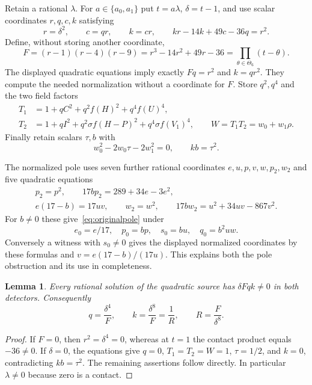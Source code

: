 \documentclass[11pt,a4paper]{article}
\newtheorem{lemma}[theorem]{Lemma}
\begin{document}
Retain a rational $\lambda$. For $a\in\{a_0,a_1\}$ put $t=a\lambda$,
$\delta=t-1$, and use scalar coordinates $r,q,c,k$ satisfying
\begin{equation}\label{eq:contactcircuit}
 r=\delta^2,\qquad c=qr,\qquad k=cr,\qquad
 kr-14k+49c-36q=r^2.
\end{equation}
Define, without storing another coordinate,
\[
 F=(r-1)(r-4)(r-9)=r^3-14r^2+49r-36
   =\prod_{\theta\in\Theta_6}(t-\theta).
\]
The displayed quadratic equations imply exactly $Fq=r^2$ and $k=qr^2$.
They compute the needed normalization without a coordinate for $F$.
Store $q^2,q^4$ and the two field factors
\begin{equation}\label{eq:packed}
 \begin{split}
 T_1&=1+qC^2+q^2f(H)^2+q^4f(U)^4,\\
 T_2&=1+qI^2+q^2\sigma f(H-P)^2+q^4\sigma f(V_1)^4,
 \qquad W=T_1T_2=w_0+w_1\rho.
 \end{split}
\end{equation}
Finally retain scalars $\tau,b$ with
\begin{equation}\label{eq:trace}
             w_0^2-2w_0\tau-2w_1^2=0,\qquad
             kb=\tau^2.
\end{equation}

The normalized pole uses seven further rational coordinates
$e,u,p,v,w,p_2,w_2$ and five quadratic equations
\begin{equation}\label{eq:normalizedpole}
 \begin{gathered}
 p_2=p^2,\qquad 17bp_2=289+34e-3e^2,\\
 e(17-b)=17uv,\qquad w_2=w^2,\qquad
 17bw_2=u^2+34uv-867v^2.
 \end{gathered}
\end{equation}
For $b\ne0$ these give~\eqref{eq:originalpole} under
\[
 e_0=e/17,\quad p_0=bp,\quad s_0=bu,\quad q_0=b^2uw.
\]
Conversely a witness with $s_0\ne0$ gives the displayed normalized
coordinates by these formulas and $v=e(17-b)/(17u)$.
This explains both the pole obstruction and its use in completeness.

\begin{lemma}\label{lem:domain}
Every rational solution of the quadratic source has $\delta Fqk\ne0$
in both detectors. Consequently
\[
 q=\frac{\delta^4}{F},\qquad
 k=\frac{\delta^8}F=\frac1R,
 \qquad R=\frac F{\delta^8}.
\]
\end{lemma}
\begin{proof}
If $F=0$, then $r^2=\delta^4=0$, whereas at $t=1$ the contact
product equals $-36\ne0$.
If $\delta=0$, the equations give $q=0$, $T_1=T_2=W=1$,
$\tau=1/2$, and $k=0$, contradicting $kb=\tau^2$.
The remaining assertions follow directly. In particular $\lambda\ne0$
because zero is a contact.
\end{proof}
\end{document}
